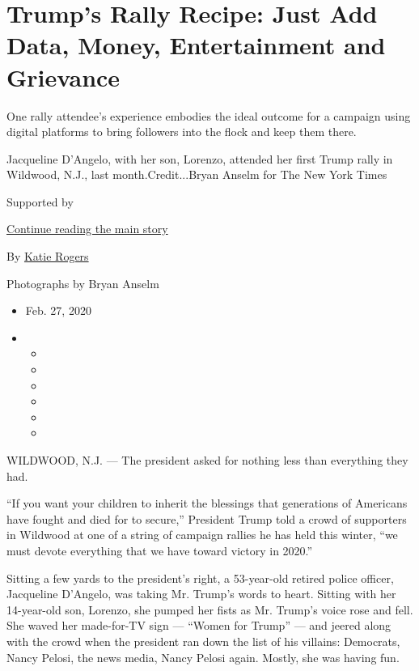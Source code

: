 \hypertarget{trumps-rally-recipe-just-add-data-money-entertainment-and-grievance}{%
\section{Trump's Rally Recipe: Just Add Data, Money, Entertainment and
Grievance}\label{trumps-rally-recipe-just-add-data-money-entertainment-and-grievance}}

One rally attendee's experience embodies the ideal outcome for a
campaign using digital platforms to bring followers into the flock and
keep them there.

Jacqueline D'Angelo, with her son, Lorenzo, attended her first Trump
rally in Wildwood, N.J., last month.Credit...Bryan Anselm for The New
York Times

Supported by

\protect\hyperlink{after-sponsor}{Continue reading the main story}

By \href{https://www.nytimes.com/by/katie-rogers}{Katie Rogers}

Photographs by Bryan Anselm

\begin{itemize}
\item
  Feb. 27, 2020
\item
  \begin{itemize}
  \item
  \item
  \item
  \item
  \item
  \item
  \end{itemize}
\end{itemize}

WILDWOOD, N.J. --- The president asked for nothing less than everything
they had.

``If you want your children to inherit the blessings that generations of
Americans have fought and died for to secure,'' President Trump told a
crowd of supporters in Wildwood at one of a string of campaign rallies
he has held this winter, ``we must devote everything that we have toward
victory in 2020.''

Sitting a few yards to the president's right, a 53-year-old retired
police officer, Jacqueline D'Angelo, was taking Mr. Trump's words to
heart. Sitting with her 14-year-old son, Lorenzo, she pumped her fists
as Mr. Trump's voice rose and fell. She waved her made-for-TV sign ---
``Women for Trump'' --- and jeered along with the crowd when the
president ran down the list of his villains: Democrats, Nancy Pelosi,
the news media, Nancy Pelosi again. Mostly, she was having fun.

